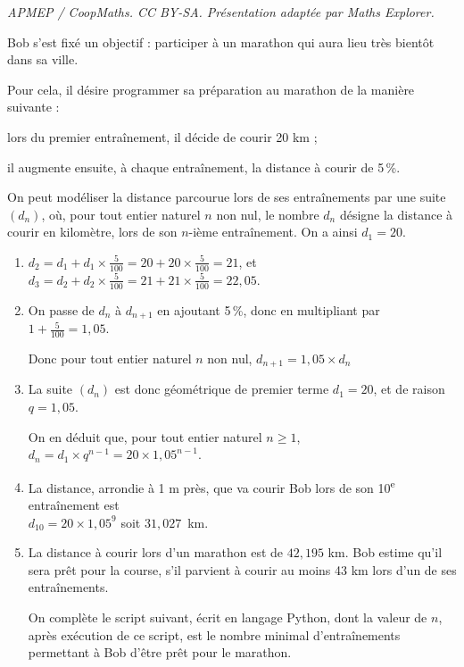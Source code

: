 \documentclass[10pt]{article}
\providecommand{\blue}{\color{blue}}
\providecommand{\ieme}{\textsuperscript{e}}
\providecommand{\blue}{\color{blue}}
\begin{document}
\noindent\textit{APMEP / CoopMaths. CC BY-SA. Présentation adaptée par Maths Explorer.}\par\medskip
\bigskip

Bob s'est fixé un objectif : participer à un marathon qui aura lieu très bientôt dans sa ville.

Pour cela, il désire programmer sa préparation au marathon de la manière suivante :

\begin{list}{\textbullet}{}
\item lors du premier entraînement, il décide de courir 20 km ;
\item il augmente ensuite, à chaque entraînement, la distance à courir de 5\,\%.
\end{list}

On peut modéliser la distance parcourue lors de ses entraînements par une suite $(d_n)$, où, pour tout entier naturel $n$ non nul, le nombre $d_n$ désigne la distance à courir en kilomètre, lors de son $n$-ième entraînement.
On a ainsi $d_1 = 20$.

\begin{enumerate}
\item $d_2 = d_1 + d_1\times \frac{5}{100} =  20 + 20\times \frac{5}{100} = 21$, et
$d_3 = d_2 + d_2\times \frac{5}{100} =  21 + 21\times \frac{5}{100} = 22,05$.

\item 
On passe de $d_n$ à $d_{n+1}$ en ajoutant 5\,\%, donc en multipliant par $1+\frac{5}{100}=1,05$. 

Donc pour tout entier naturel $n$ non nul,  $d_{n+1}= 1,05\times d_n$ 

\item La suite $(d_n)$ est donc géométrique de premier terme $d_1=20$, et de raison $q=1,05$.

 On en déduit que, pour tout entier naturel $n \geqslant 1$, $d_n= d_1\times q^{n-1} = 20\times 1,05^{n-1}$.

\item La distance, arrondie à 1 m près, que va courir Bob lors de son 10\ieme{} entraînement est\\
$d_{10} = 20\times 1,05^{9}$ soit $31,027$~km.

\item La distance à courir lors d'un marathon est de $42,195$ km. Bob estime qu'il sera prêt pour la course, s'il parvient à courir au moins 43 km lors d'un de ses entraînements.

On complète le script suivant, écrit en langage Python, dont la valeur de $n$, après exécution de ce script, est le nombre minimal d'entraînements permettant à Bob d'être prêt pour le marathon.

\begin{center}
\fbox{\tt
\begin{tabular}{l}
n = 1\\
d = 20\\
while {\blue d < 43} :\\
\quad n = \blue n + 1\\
\quad d = 1.05*d
\end{tabular}
}
\end{center}

\end{enumerate}
\end{document}
